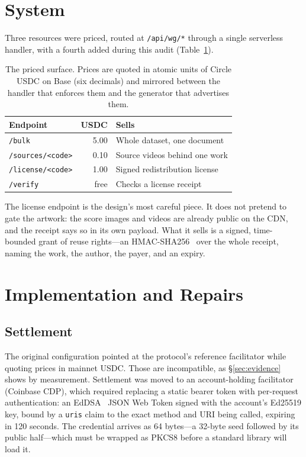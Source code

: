 \documentclass[10pt,letterpaper,twocolumn]{article}
\newcommand{\code}[1]{\texttt{#1}}
\begin{document}
\section{System}
\label{sec:system}

Three resources were priced, routed at \code{/api/wg/*} through a single
serverless handler, with a fourth added during this audit
(Table~\ref{tab:endpoints}).

\begin{table}[t]
\centering
\footnotesize
\begin{tabularx}{\columnwidth}{@{}lrX@{}}
\toprule
\textbf{Endpoint} & \textbf{USDC} & \textbf{Sells} \\
\midrule
\code{/bulk} & 5.00 & Whole dataset, one document \\
\code{/sources/<code>} & 0.10 & Source videos behind one work \\
\code{/license/<code>} & 1.00 & Signed redistribution license \\
\code{/verify} & free & Checks a license receipt \\
\bottomrule
\end{tabularx}
\caption{The priced surface. Prices are quoted in atomic units of Circle USDC
on Base (six decimals) and mirrored between the handler that enforces them and
the generator that advertises them.}
\label{tab:endpoints}
\end{table}

The license endpoint is the design's most careful piece. It does not pretend
to gate the artwork: the score images and videos are already public on the
CDN, and the receipt says so in its own payload. What it sells is a signed,
time-bounded grant of reuse rights---an HMAC-SHA256~\citep{rfc2104} over the
whole receipt, naming the work, the author, the payer, and an expiry.

\section{Implementation and Repairs}
\label{sec:impl}

\subsection{Settlement}

The original configuration pointed at the protocol's reference facilitator
while quoting prices in mainnet USDC. Those are incompatible, as
\S\ref{sec:evidence} shows by measurement. Settlement was moved to an
account-holding facilitator (Coinbase CDP), which required replacing a static
bearer token with per-request authentication: an EdDSA~\citep{rfc8032} JSON
Web Token signed with the account's Ed25519 key, bound by a \code{uris} claim
to the exact method and URI being called, expiring in 120 seconds. The
credential arrives as 64 bytes---a 32-byte seed followed by its public
half---which must be wrapped as PKCS8 before a standard library will load it.
\end{document}
